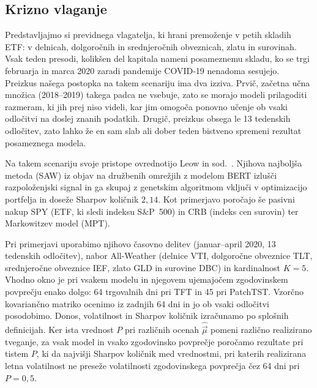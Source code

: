 \documentclass[9pt]{style/friteza}
\begin{document}

\subsection{Krizno vlaganje}\label{sec:leow}

Predstavljajmo si previdnega vlagatelja, ki hrani premoženje v petih skladih ETF: v delnicah, dolgoročnih in srednjeročnih obveznicah, zlatu in surovinah. Vsak teden presodi, kolikšen del kapitala nameni posameznemu skladu, ko se trgi februarja in marca 2020 zaradi pandemije COVID-19 nenadoma sesujejo. Preizkus našega postopka na takem scenariju ima dva izziva. Prvič, začetna učna množica (2018--2019) takega padca ne vsebuje, zato se morajo modeli prilagoditi razmeram, ki jih prej niso videli, kar jim omogoča ponovno učenje ob vsaki odločitvi na doslej znanih podatkih. Drugič, preizkus obsega le 13 tedenskih odločitev, zato lahko že en sam slab ali dober teden bistveno spremeni rezultat posameznega modela.

Na takem scenariju svoje pristope ovrednotijo Leow in sod.~\cite{leow2021}. Njihova najboljša metoda (SAW) iz objav na družbenih omrežjih z modelom BERT izlušči razpoloženjski signal in ga skupaj z genetskim algoritmom vključi v optimizacijo portfelja in doseže Sharpov količnik $2{,}14$. Kot primerjavo poročajo še pasivni nakup SPY (ETF, ki sledi indeksu S\&P~500) in CRB (indeks cen surovin) ter Markowitzev model (MPT).

Pri primerjavi uporabimo njihovo časovno delitev (januar--april 2020, 13 tedenskih odločitev), nabor All-Weather (delnice VTI, dolgoročne obveznice TLT, srednjeročne obveznice IEF, zlato GLD in surovine DBC) in kardinalnost $K=5$. Vhodno okno je pri vsakem modelu in njegovem ujemajočem zgodovinskem povprečju enako dolgo: 64 trgovalnih dni pri TFT in 45 pri PatchTST. Vzorčno kovariančno matriko ocenimo iz zadnjih 64 dni in jo ob vsaki odločitvi posodobimo. Donos, volatilnost in Sharpov količnik izračunamo po splošnih definicijah. Ker ista vrednost $P$ pri različnih ocenah $\hat{\vec{\mu}}$ pomeni različno realizirano tveganje, za vsak model in vsako zgodovinsko povprečje poročamo rezultate pri tistem $P$, ki da najvišji Sharpov količnik med vrednostmi, pri katerih realizirana letna volatilnost ne preseže volatilnosti zgodovinskega povprečja čez 64 dni pri $P=0{,}5$. 
\end{document}
